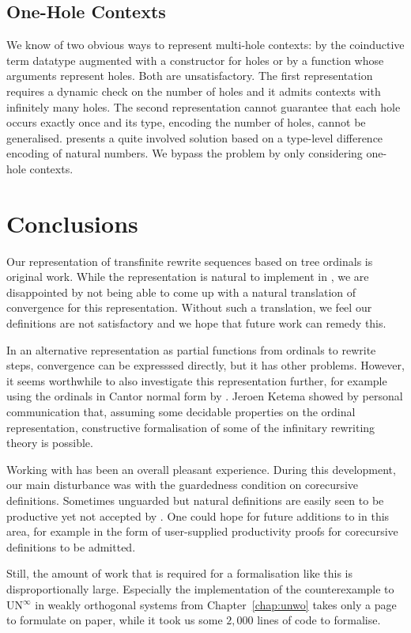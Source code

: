 \subsection{One-Hole Contexts}\label{sub:contexts}

We know of two obvious ways to represent multi-hole contexts:
by the coinductive term datatype augmented with a constructor for
holes or by a function whose arguments represent holes.
Both are unsatisfactory. The first representation requires a dynamic
check on the number of holes and it admits contexts with infinitely
many holes. The second representation cannot guarantee
that each hole occurs exactly once and its type, encoding the number of
holes, cannot be generalised. \citet{lindley-08} presents a quite
involved solution based on a type-level difference encoding of natural
numbers. We bypass the problem by only considering one-hole contexts.


\section{Conclusions}

Our representation of transfinite rewrite sequences based on tree
ordinals is original work. While the representation is natural to
implement in \Coq, we are disappointed by not being able to come up
with a natural translation of convergence for this
representation. Without such a translation, we feel our definitions
are not satisfactory and we hope that future work can remedy this.


In an alternative representation as partial functions from
ordinals to rewrite steps, convergence can be expresssed directly, but it has
other problems. However, it seems
worthwhile to also investigate this representation further, for example
using the ordinals in Cantor normal form by
\citet{casteran-06}. Jeroen Ketema showed by personal communication
that, assuming some decidable properties on the ordinal representation,
constructive formalisation of some of the infinitary rewriting theory is
possible.

Working with \Coq has been an overall pleasant experience. During this
development, our main disturbance was with the guardedness condition
on corecursive definitions. Sometimes unguarded but natural
definitions are easily seen to be productive yet not accepted by
\Coq. One could hope for future additions to \Coq in this area, for
example in the form of user-supplied productivity proofs for
corecursive definitions to be admitted.

Still, the amount of work that is required for a formalisation like
this is disproportionally large. Especially the implementation of the
counterexample to UN$^\infty$ in weakly orthogonal systems from
Chapter~\ref{chap:unwo} takes only a page to formulate on paper, while
it took us some $2,000$ lines of \Coq code to formalise.


